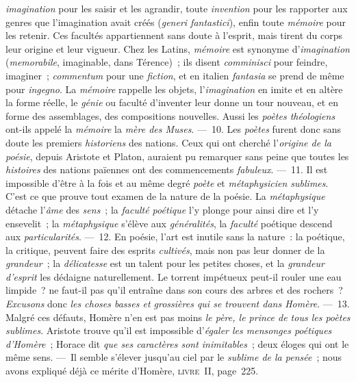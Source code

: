 \documentclass[french,twoside]{book} %
\begin{document}
{\itshape imagination} pour les saisir et les agrandir, toute {\itshape invention} pour les rapporter aux genres que l’imagination avait créés ({\itshape generi fantastici}),  enfin toute {\itshape mémoire} pour les retenir. Ces facultés appartiennent sans doute à l’esprit, mais tirent du corps leur origine et leur vigueur. Chez les Latins, {\itshape mémoire} est synonyme d’{\itshape imagination} ({\itshape memorabile}, imaginable, dans Térence) ; ils disent {\itshape comminisci} pour feindre, imaginer ; {\itshape commentum} pour une {\itshape fiction}, et en italien {\itshape fantasia} se prend de même pour {\itshape ingegno}. La {\itshape mémoire} rappelle les objets, l’{\itshape imagination} en imite et en altère la forme réelle, le {\itshape génie} ou faculté d’inventer leur donne un tour nouveau, et en forme des assemblages, des compositions nouvelles. Aussi les {\itshape poètes théologiens} ont-ils appelé la {\itshape mémoire} la {\itshape mère des Muses}. — 10. Les {\itshape poètes} furent donc sans doute les premiers {\itshape historiens} des nations. Ceux qui ont cherché l’{\itshape origine de la poésie}, depuis Aristote et Platon, auraient pu remarquer sans peine que toutes les {\itshape histoires} des nations païennes ont des commencements {\itshape fabuleux}. — 11. Il est impossible d’être à la fois et au même degré {\itshape poète} et {\itshape métaphysicien sublimes}. C’est ce que prouve tout examen de la nature de la poésie. La {\itshape métaphysique} détache l’{\itshape âme} des {\itshape sens} ; la {\itshape faculté poétique} l’y plonge pour ainsi dire et l’y ensevelit ; la {\itshape métaphysique} s’élève aux {\itshape généralités}, la {\itshape faculté} poétique descend aux {\itshape particularités}. — 12. En poésie, l’art est inutile sans la nature : la poétique, la critique, peuvent faire des esprits {\itshape cultivés}, mais non pas leur donner de la {\itshape grandeur} ; la {\itshape délicatesse} est un talent pour les petites choses, et la {\itshape grandeur d’esprit} les dédaigne naturellement. Le torrent impétueux  peut-il rouler une eau limpide ? ne faut-il pas qu’il entraîne dans son cours des arbres et des rochers ? {\itshape Excusons} donc {\itshape les choses basses et grossières qui se trouvent dans Homère}. — 13. Malgré ces défauts, Homère n’en est pas moins {\itshape le père, le prince de tous les poètes sublimes}. Aristote trouve qu’il est impossible d’{\itshape égaler les mensonges poétiques d’Homère} ; Horace dit {\itshape que ses caractères sont inimitables} ; deux éloges qui ont le même sens. — Il semble s’élever jusqu’au ciel par le {\itshape sublime de la pensée} ; nous avons expliqué déjà ce mérite d’Homère, {\scshape livre} II, page 225.\par
\end{document}
